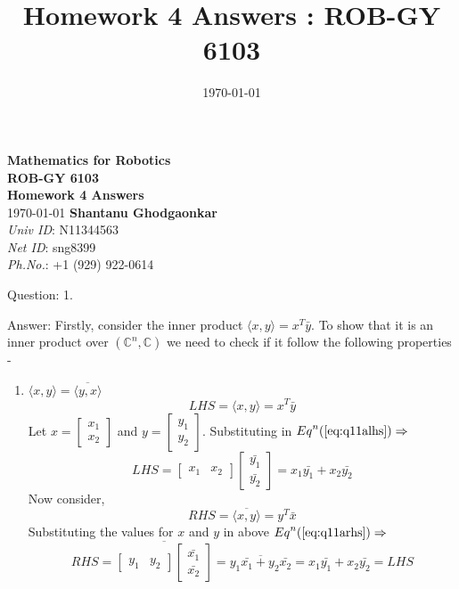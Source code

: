 \documentclass[a4paper]{article}
\title{Homework 4 Answers : ROB-GY 6103}
\author{\myName}
\date{\today}
\newcommand{\myName}{\textbf{Shantanu Ghodgaonkar}\\\textit{Univ ID}: N11344563\\\textit{Net ID}: sng8399\\\textit{Ph.No.}: +1 (929) 922-0614}
\begin{document}
	
	\begin{titlepage}
	    \centering
	    \vspace{2cm}
	    \Huge\textbf{Mathematics for Robotics \\ ROB-GY 6103 \\ Homework 4 Answers}
	    \vspace{1cm}
	    \\ \Large \today
	    \vfill
	    \Large \myName
	\end{titlepage}
	
	\begin{qalist}			
		\item[Question: 1.] \setcounter{equation}{0}
		\item[Answer:] Firstly, consider the inner product $\langle x,y \rangle = {x}^{T}\bar{y}$. To show that it is an inner product over $({\mathbb{C}}^{n}, \mathbb{C})$ we need to check if it follow the following properties - 
		\begin{enumerate}[label=\alph*., align=left]
			\item $\langle x,y \rangle = \overline{\langle y,x \rangle}$
				\begin{equation}\label{eq:q11alhs}
					LHS = \langle x,y \rangle = {x}^{T}\bar{y}
				\end{equation}
				Let $x = \begin{bmatrix}{x}_{1} \\ {x}_{2}\end{bmatrix}$ and $y = \begin{bmatrix}{y}_{1} \\ {y}_{2}\end{bmatrix}$. Substituting in ${Eq}^{n}(\ref{eq:q11alhs}) \Rightarrow$
				\begin{equation}
					LHS = \begin{bmatrix}{x}_{1} & {x}_{2}\end{bmatrix} \begin{bmatrix}\bar{{y}_{1}} \\ \bar{{y}_{2}}\end{bmatrix} = {x}_{1}\bar{{y}_{1}} + {x}_{2}\bar{{y}_{2}}
				\end{equation}
				Now consider, 
				\begin{equation}\label{eq:q11arhs}
					RHS = \overline{\langle x,y \rangle} = {y}^{T}\bar{x}
				\end{equation}
				Substituting the values for $x$ and $y$ in above ${Eq}^{n}(\ref{eq:q11arhs}) \Rightarrow$
				\begin{equation}
					RHS = \overline{\begin{bmatrix}{y}_{1} & {y}_{2}\end{bmatrix} \begin{bmatrix}\bar{{x}_{1}} \\ \bar{{x}_{2}}\end{bmatrix}} = \overline{{y}_{1}\bar{{x}_{1}} + {y}_{2}\bar{{x}_{2}}} = {x}_{1}\bar{{y}_{1}} + {x}_{2}\bar{{y}_{2}} = LHS
				\end{equation}
				

\end{enumerate}
\end{qalist}
\end{document}
